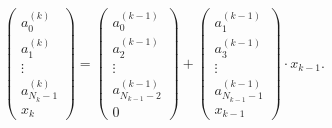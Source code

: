 \documentclass[
  10pt,
  fontset=fandol]{ctexart}
\begin{document}
\[
\begin{pmatrix}
a_0^{(k)}\\
a_1^{(k)}\\
\vdots\\
a_{N_k-1}^{(k)}\\
x_k
\end{pmatrix}
=
\begin{pmatrix}
a_0^{(k-1)}\\
a_2^{(k-1)}\\
\vdots\\
a_{N_{k-1}-2}^{(k-1)}\\
0
\end{pmatrix}
+
\begin{pmatrix}
a_1^{(k-1)}\\
a_3^{(k-1)}\\
\vdots\\
a_{N_{k-1}-1}^{(k-1)}\\
x_{k-1}
\end{pmatrix}\cdot x_{k-1}.
\]
\end{document}
